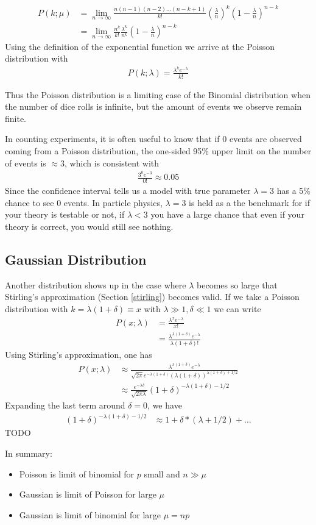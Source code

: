 \begin{align}
P(k; \mu) &= \lim_{n\to \infty} \frac{n(n-1)(n-2)...(n-k+1)}{k!}\left(\frac{\lambda}{n}\right)^k\left(1-\frac{\lambda}{n}\right)^{n-k}\\
&= \lim_{n\to \infty}\frac{n^k}{k!}\frac{\lambda^k}{n^k}\left(1-\frac{\lambda}{n}\right)^{n-k}
\end{align}
Using the definition of the exponential function we arrive at the Poisson distribution with
\begin{align}
P(k; \lambda) = \frac{\lambda^ke^{-\lambda}}{k!}
\end{align}

Thus the Poisson distribution is a limiting case of the Binomial distribution when the number of dice rolls is infinite, but the amount of events we observe remain finite.

In counting experiments, it is often useful to know that if 0 events are observed coming from a Poisson distribution, the one-sided 95\% upper limit on the number of events is $\approx 3$, which is consistent with
\begin{align}
	\frac{3^0e^{-3}}{0!} \approx 0.05
\end{align}
Since the confidence interval tells us a model with true parameter $\lambda=3$ has a 5\% chance to see 0 events. In particle physics, $\lambda=3$ is held as a the benchmark for if your theory is testable or not, if $\lambda < 3$ you have a large chance that even if your theory is correct, you would still see nothing. 



\subsection{Gaussian Distribution}
Another distribution shows up in the case where $\lambda$ becomes so large that Stirling's approximation (Section \ref{stirling}) becomes valid. If we take a Poisson distribution with  $k = \lambda(1+\delta) \equiv x$ with $\lambda \gg 1, \delta \ll 1$ we can write
\begin{align}
	P(x; \lambda) &= \frac{\lambda^xe^{-\lambda}}{x!}\\
	&= \frac{\lambda^{\lambda(1+\delta)}e^{-\lambda}}{\lambda(1+\delta)!}
\end{align}
Using Stirling's approximation, one has
\begin{align}
		P(x; \lambda) &\approx \frac{\lambda^{\lambda(1+\delta)}e^{-\lambda}}{\sqrt{2\pi}e^{-\lambda(1+\delta)}(\lambda(1+\delta))^{\lambda(1+\delta)+1/2}}\\
		&\approx \frac{e^{-\lambda\delta}}{\sqrt{2\pi\lambda}} (1+\delta)^{-\lambda(1+\delta)-1/2}
\end{align}
Expanding the last term around $\delta=0$, we have
\begin{align}
	(1+\delta)^{-\lambda(1+\delta)-1/2} &\approx 1 + \delta*(\lambda+1/2) + \dots
\end{align} 
TODO

In summary:
\begin{itemize}
	\item Poisson is limit of binomial for $p$ small and $n\gg \mu$
	\item Gaussian is limit of Poisson for large $\mu$
	\item Gaussian is limit of binomial for large $\mu=np$
\end{itemize}



